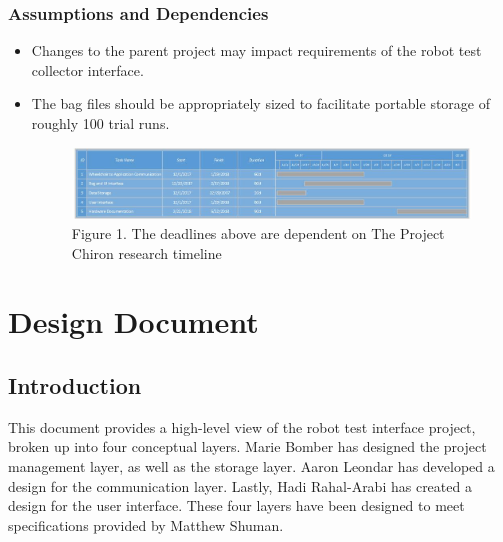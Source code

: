\documentclass[onecolumn, draftclsnofoot,10pt, compsoc]{report}
\begin{document}
	\subsection{Assumptions and Dependencies}
	\begin{itemize}
		\item Changes to the parent project may impact requirements of the robot test collector interface.
		\item The bag files should be appropriately sized to facilitate portable storage of roughly 100 trial runs.
		\begin{figure}[h!]
			
			\centering
			\includegraphics[width=\linewidth, scale=0.7]{PrelimGanttChart.jpg}
			Figure 1. The deadlines above are dependent on The Project Chiron research timeline
		\end{figure}
		
	\end{itemize}
	


\chapter{Design Document}
\minitoc

\section{Introduction}
This document provides a high-level view of the robot test interface project, broken up into four conceptual layers. Marie Bomber has designed the project management layer, as well as the storage layer. Aaron Leondar has developed a design for the communication layer. Lastly, Hadi Rahal-Arabi has created a design for the user interface. These four layers have been designed to meet specifications provided by Matthew Shuman.
\end{document}
